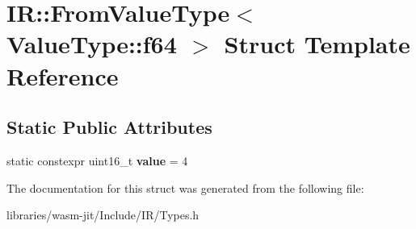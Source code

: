 \hypertarget{struct_i_r_1_1_from_value_type_3_01_value_type_1_1f64_01_4}{}\section{IR\+:\+:From\+Value\+Type$<$ Value\+Type\+:\+:f64 $>$ Struct Template Reference}
\label{struct_i_r_1_1_from_value_type_3_01_value_type_1_1f64_01_4}
\subsection*{Static Public Attributes}
\begin{DoxyCompactItemize}
\item 
\mbox{\label{struct_i_r_1_1_from_value_type_3_01_value_type_1_1f64_01_4_acbbc8f93ca9852cf2a751581bfdfae6c}} 
static constexpr uint16\+\_\+t {\bfseries value} = 4
\end{DoxyCompactItemize}


The documentation for this struct was generated from the following file\+:\begin{DoxyCompactItemize}
\item 
libraries/wasm-\/jit/\+Include/\+I\+R/Types.\+h\end{DoxyCompactItemize}
